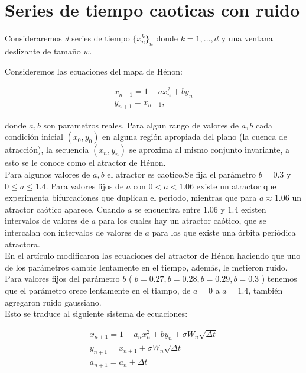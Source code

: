 \documentclass{article}
\begin{document}
\maketitle

\section{Series de tiempo caoticas con ruido}

Consideraremos \textit{d} series de tiempo $\{x^{k}_{n}\}_n$ donde $k = 1,...,d$ y una ventana deslizante de tamaño $w$.

Consideremos las ecuaciones del mapa de Hénon:

\begin{align}
   x_{n + 1} = 1 - ax^{2}_{n} + by_{n}\\
   y_{n + 1} = x_{n + 1}, \nonumber
\end{align}

donde $ a , b $ son parametros reales. Para algun rango de valores de $ a , b $ cada condición inicial $ (x_{0} , y_{0} )$ en alguna región apropiada del plano (la cuenca de atracción), la secuencia $ (x_{n} , y_{n}) $ se aproxima al mismo conjunto invariante, a esto se le conoce como el atractor de Hénon.\\

Para algunos valores de $ a , b $ el atractor es caotico.Se fija el parámetro $ b = 0.3 $ y $ 0 \leq a \leq 1.4 $. Para valores fijos de $ a $ con $ 0 < a < 1.06 $ existe un atractor que experimenta bifurcaciones que duplican el periodo, mientras que para $ a \approx 1.06 $ un atractor caótico aparece. Cuando $ a $ se encuentra entre $ 1.06 $ y $ 1.4 $ existen intervalos de valores de $ a $ para los cuales hay un atractor caótico, que se intercalan con intervalos de valores de $ a $ para los que existe una órbita periódica atractora. \\

En el artículo modificaron las ecuaciones del atractor de Hénon haciendo que uno de los parámetros cambie lentamente en el tiempo, además, le metieron ruido. Para valores fijos del parámetro $ b $ ( $ b = 0.27 , b = 0.28 , b = 0.29 , b = 0.3 $ ) tenemos que el parámetro crece lentamente en el tiampo, de $ a = 0 $ a $ a = 1.4 $, también agregaron ruido gaussiano.\\ 
Esto se traduce al siguiente sistema de ecuaciones:

\begin{align}
   x_{n + 1} = 1 - a_{n}x^{2}_{n} + by_{n} + \sigma W_{n} \sqrt{\Delta t}\\
   y_{n + 1} = x_{n + 1} + \sigma W_{n} \sqrt{\Delta t}\\
   a_{n + 1} = a_{n} + \Delta t\\
\end{align}
\end{document}
